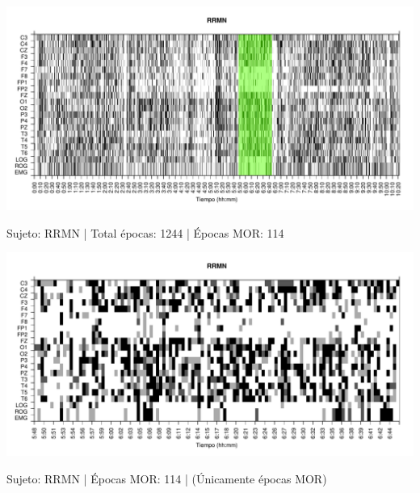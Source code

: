 \begin{SidewaysFigure}
\centering
\includegraphics[width=\linewidth]
{./material_bonito170220/RRMNS_114_mor114_tot1244_est_total_bis.pdf} 
\caption{Sujeto: RRMN | Total \'epocas: 1244 | \'Epocas MOR: 114}
\end{SidewaysFigure}
\begin{SidewaysFigure}
\centering
\includegraphics[width=\linewidth]
{./material_bonito170220/RRMNS_114_mor114_tot114_est_mor_bis.pdf} 
\caption{Sujeto: RRMN | \'Epocas MOR: 114 | (\'Unicamente \'epocas MOR)}
\end{SidewaysFigure}


